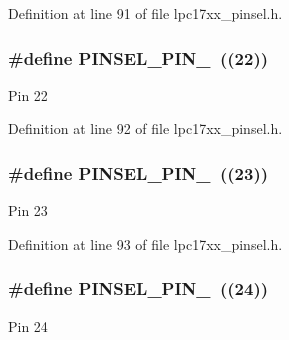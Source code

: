Definition at line 91 of file lpc17xx\+\_\+pinsel.\+h.

\subsubsection[{\texorpdfstring{P\+I\+N\+S\+E\+L\+\_\+\+P\+I\+N\+\_\+22}{PINSEL_PIN_22}}]{\setlength{\rightskip}{0pt plus 5cm}\#define P\+I\+N\+S\+E\+L\+\_\+\+P\+I\+N\+\_~((22))}\hypertarget{group___p_i_n_s_e_l___public___macros_ga27e3f393b4659a93c8f4d3b3b3a07895}{}\label{group___p_i_n_s_e_l___public___macros_ga27e3f393b4659a93c8f4d3b3b3a07895}
Pin 22 

Definition at line 92 of file lpc17xx\+\_\+pinsel.\+h.

\subsubsection[{\texorpdfstring{P\+I\+N\+S\+E\+L\+\_\+\+P\+I\+N\+\_\+23}{PINSEL_PIN_23}}]{\setlength{\rightskip}{0pt plus 5cm}\#define P\+I\+N\+S\+E\+L\+\_\+\+P\+I\+N\+\_~((23))}\hypertarget{group___p_i_n_s_e_l___public___macros_ga0bf6017400b515d5384cc6c9b2616dfb}{}\label{group___p_i_n_s_e_l___public___macros_ga0bf6017400b515d5384cc6c9b2616dfb}
Pin 23 

Definition at line 93 of file lpc17xx\+\_\+pinsel.\+h.

\subsubsection[{\texorpdfstring{P\+I\+N\+S\+E\+L\+\_\+\+P\+I\+N\+\_\+24}{PINSEL_PIN_24}}]{\setlength{\rightskip}{0pt plus 5cm}\#define P\+I\+N\+S\+E\+L\+\_\+\+P\+I\+N\+\_~((24))}\hypertarget{group___p_i_n_s_e_l___public___macros_ga59268564226c0dec33b412a4cd60652e}{}\label{group___p_i_n_s_e_l___public___macros_ga59268564226c0dec33b412a4cd60652e}
Pin 24 

